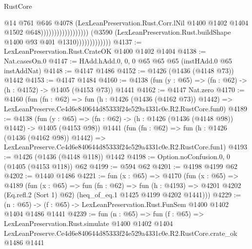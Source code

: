 \begin{lexlean}{RustCore}
\begin{coremodule}
                                                            @14
                                                            @761
                                                            @646
                                                            @4078
                                                            (LexLeanPreservation.Rust.Corr.lNil
                                                              @1400
                                                              @1402
                                                              @1404
                                                              @1502
                                                              @648))))))))))))))))))
                          (@3590
                            (LexLeanPreservation.Rust.buildShape @1400 @93 @401 @1310)))))))))))))
@4137 := LexLeanPreservation.Rust.CrateOK @1400 @1402 @1404
@4138 := Nat.casesOn.{0}
@4147 := HAdd.hAdd.{0, 0, 0} @65 @65 @65 (instHAdd.{0} @65 instAddNat)
@4148 := @4147 @1486
@4152 := @1426 (@1436 (@4148 @73)) @1442
@4153 := @4147 @1484
@4160 := @4138 (fun (y : @65) => (fn : @62) -> (h : @4152) -> @1405 (@4153 @73)) @1441
@4162 := @4147 Nat.zero
@4170 := @4160
    (fun (fn : @62) =>
    fun (h : @1426 (@1436 (@4162 @73)) @1442) =>
    LexLeanPreserve.Ce4d6e840644d85333f24e529a4331c0e.R2.RustCore.fun0)
@4189 := @4138
    (fun (y : @65) => (fn : @62) -> (h : @1426 (@1436 (@4148 @98)) @1442) -> @1405 (@4153 @98))
    @1441
    (fun (fn : @62) =>
    fun (h : @1426 (@1436 (@4162 @98)) @1442) =>
    LexLeanPreserve.Ce4d6e840644d85333f24e529a4331c0e.R2.RustCore.fun1)
@4193 := @1426 (@1436 (@4148 @118)) @1442
@4198 := Option.noConfusion.{0, 0} (@1405 (@4153 @118)) @62
@4199 := @594 @62
@4201 := @4198 @4199 @62
@4202 := @1440 @1486
@4221 := fun (x : @65) =>
  @4170
    (fun (x : @65) =>
    @4189
      (fun (x : @65) =>
      fun (fn : @62) =>
      fun (h : @4193) =>
      @4201 @4202 (Eq.refl.{2} (Sort 1) @62) (heq_of_eq.{1} @1425 @4199 @4202 @1441)))
@4229 := (n : @65) -> (f : @65) -> LexLeanPreservation.Rust.FunSem @1400 @1402 @1404 @1486 @1441
@4239 := fun (n : @65) =>
  fun (f : @65) =>
  LexLeanPreservation.Rust.simulate
    @1400
    @1402
    @1404
    LexLeanPreserve.Ce4d6e840644d85333f24e529a4331c0e.R2.RustCore.crate_ok
    @1486
    @1441
\end{coremodule}
\end{lexlean}
